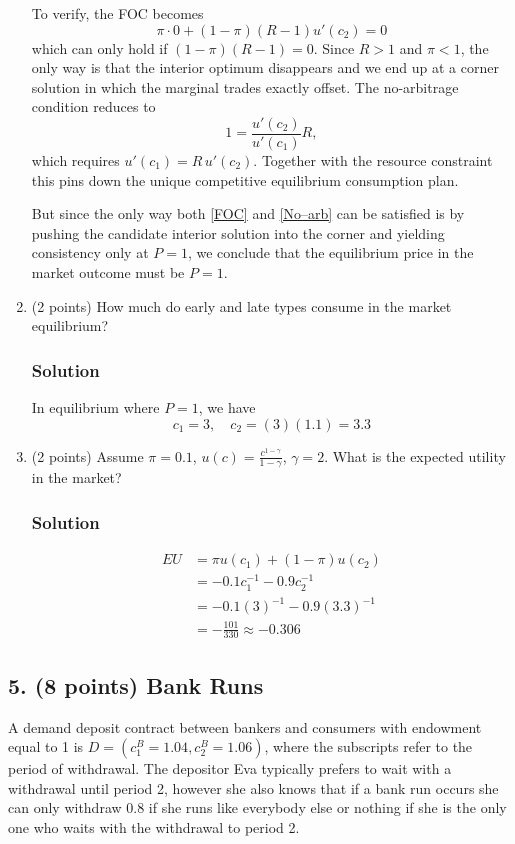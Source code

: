 \documentclass[12pt]{article}
\begin{document}
\begin{enumerate}[label=(\alph*)]
To verify, the FOC becomes $$\pi\cdot0 + (1-\pi)(R-1)u'(c_2)=0$$ which can only hold if $(1-\pi)(R-1)=0$.  Since $R>1$ and $\pi<1$, the only way is that the interior optimum disappears and we end up at a corner solution in which the marginal trades exactly offset.
The no-arbitrage condition reduces to $$1 = \dfrac{u'(c_2)}{u'(c_1)}R,$$ which requires $u'(c_1)=R\,u'(c_2)$.  Together with the resource constraint this pins down the unique competitive equilibrium consumption plan.

But since the only way both \eqref{FOC} and \eqref{No–arb} can be satisfied is by pushing the candidate interior solution into the corner and yielding consistency only at $P=1$, we conclude that the equilibrium price in the market outcome must be $P=1$.
    
    \item (2 points) How much do early and late types consume in the market equilibrium?
    \subsubsection*{Solution}

    In equilibrium where $P=1$, we have
    \[ c_1 =3, \quad c_2 = (3)(1.1) = 3.3\]

    
    \item (2 points) Assume $\pi = 0.1$, $u(c) = \frac{c^{1-\gamma}}{1- \gamma}$, $\gamma = 2$. What is the expected utility in the market?
    \subsubsection*{Solution}

    \begin{align*}
        EU &= \pi u(c_1) + (1-\pi)u(c_2) 
        \\ &= -0.1 c_1^{-1} - 0.9 c_2^{-1}
        \\ &= -0.1 (3)^{-1} - 0.9 (3.3)^{-1}
        \\ &= -\frac{101}{330} \approx -0.306
    \end{align*}


    
\end{enumerate}

\subsection*{5. (8 points) Bank Runs}

A demand deposit contract between bankers and consumers with endowment equal to 1 is $D = (c^B_1 = 1.04, c^B_2 = 1.06)$, where the subscripts refer to the period of withdrawal. The depositor Eva typically prefers to wait with a withdrawal until period 2, however she also knows that if a bank run occurs she can only withdraw 0.8 if she runs like everybody else or nothing if she is the only one who waits with the withdrawal to period 2.
\end{document}
